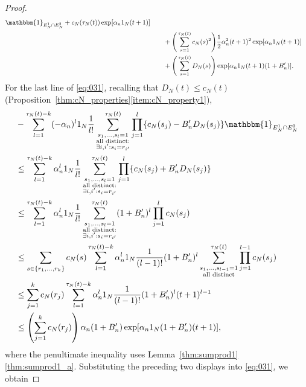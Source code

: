 \documentclass[12pt,authoryear]{article}
\theoremstyle{definition}
\newcommand{\1}[1]{\mathbbm{1}_{#1}}
\newcommand{\ON}{1_N}
\begin{document}
\begin{proof}
\begin{align*}
        \1{E_N^1 \cap E_N^2}
        + c_N(\tau_N(t)) \exp[ \alpha_n \ON (t+1) ] \\
    &\qquad+ \Bigg( \sum_{s=1}^{\tau_N(t)} c_N(s)^2 \Bigg)
        \frac{1}{2} \alpha_n^2 (t+1)^2 \exp[ \alpha_n \ON (t+1) ] \\
    &\qquad+ \Bigg( \sum_{s=1}^{\tau_N(t)} D_N(s) \Bigg)
        \exp[ \alpha_n \ON (t+1) (1+B_n^\prime) ] .
\end{align*}
For the last line of \eqref{eq:031}, recalling that $D_N(t) \leq c_N(t)$ (Proposition~\ref{thm:cN_properties}\ref{item:cN_property1}),
\begin{align*}
&- \sum_{l=1}^{\tau_N(t) -k} (-\alpha_n)^l \ON \frac{1}{l!}
        \sum_{\substack{s_1, \dots, s_l =1 \\ \text{all distinct}: 
        \\ \exists i,i^\prime : s_i=r_{i^\prime} }}^{\tau_N(t)} 
        \prod_{j=1}^l \{ c_N(s_j) - B_n^\prime D_N(s_j) \} 
        \1{E_N^1 \cap E_N^2} \\
&\leq \sum_{l=1}^{\tau_N(t) -k} \alpha_n^l \ON \frac{1}{l!}
        \sum_{\substack{s_1, \dots, s_l =1 \\ \text{all distinct}: 
        \\ \exists i,i^\prime : s_i=r_{i^\prime} }}^{\tau_N(t)} 
        \prod_{j=1}^l \{ c_N(s_j) + B_n^\prime D_N(s_j) \} \\
&\leq \sum_{l=1}^{\tau_N(t) -k} \alpha_n^l \ON \frac{1}{l!}
        \sum_{\substack{s_1, \dots, s_l =1 \\ \text{all distinct}: 
        \\ \exists i,i^\prime : s_i=r_{i^\prime} }}^{\tau_N(t)} 
        (1 + B_n^\prime)^l \prod_{j=1}^l c_N(s_j) \\
&\leq \sum_{s \in \{r_1,\dots,r_k\} } c_N(s)
        \sum_{l=1}^{\tau_N(t) -k} \alpha_n^l \ON
        \frac{1}{(l-1)!}  (1 + B_n^\prime)^l
        \sum_{\substack{ s_1, \dots, s_{l-1} =1 \\ \text{all distinct} }}^{\tau_N(t)}
        \prod_{j=1}^{l-1} c_N(s_j) \\
&\leq \sum_{j=1}^k c_N(r_j)
        \sum_{l=1}^{\tau_N(t) -k} \alpha_n^l \ON
        \frac{1}{(l-1)!}  (1 + B_n^\prime)^l (t+1)^{l-1} \\
&\leq \left( \sum_{j=1}^k c_N(r_j) \right)
        \alpha_n (1 + B_n^\prime) 
        \exp[ \alpha_n \ON (1 + B_n^\prime) (t+1) ] ,
\end{align*}
where the penultimate inequality uses Lemma~\ref{thm:sumprod1}\ref{thm:sumprod1_a}.
Substituting the preceding two displays into \eqref{eq:031}, we obtain

\end{proof}
\end{document}
